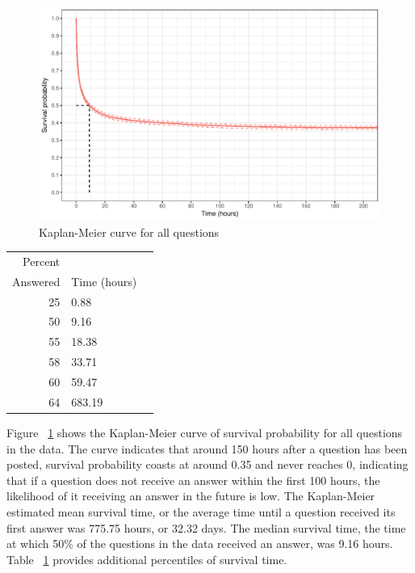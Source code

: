 \documentclass{article}
\begin{document}
\begin{figure}[h!]
  \includegraphics[scale=1]{kmcurve.pdf}
  \caption{Kaplan-Meier curve for all questions}
  \label{fig:kmcurve}
\end{figure}

\begin{Schunk}
\end{Schunk}

\begin{table}[ht]
\centering
\begin{tabular}{rlr}
  \hline
  Percent \\ Answered & Time (hours) \\ 
  \hline
  25 & 0.88 \\ 
  50 & 9.16 \\ 
  55 & 18.38 \\ 
  58 & 33.71 \\ 
  60 & 59.47 \\ 
  64 & 683.19 \\ 
   \hline
\end{tabular}
\label{table:quantiles}
\end{table}

  Figure  ~\ref{fig:kmcurve} shows the Kaplan-Meier curve of survival probability for all questions in the data. The curve indicates that around 150 hours after a question has been posted, survival probability coasts at around 0.35 and never reaches 0, indicating that if a question does not receive an answer within the first 100 hours, the likelihood of it receiving an answer in the future is low. The Kaplan-Meier estimated mean survival time, or the average time until a question received its first answer was 775.75 hours, or 32.32 days. The median survival time, the time at which 50\% of the questions in the data received an answer, was 9.16 hours. Table ~\ref{table:quantiles} provides additional percentiles of survival time.
  
\end{document}
